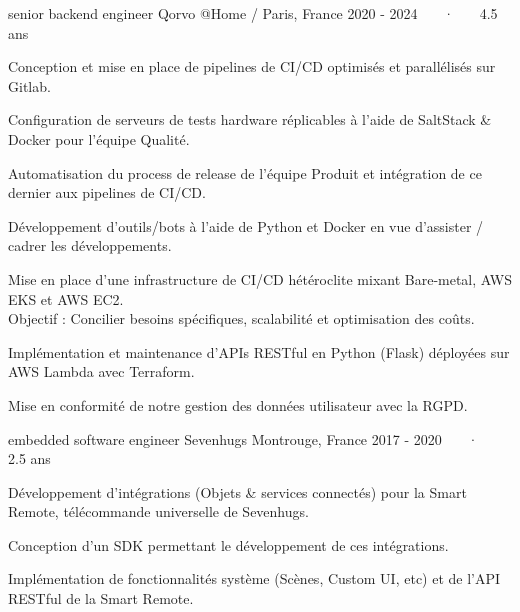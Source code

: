 

\begin{cventries}

  \cventry
    {senior backend engineer} %
    {Qorvo} %
    {@Home / Paris, France} %
    {2020 - 2024 ~~~·~~~ 4.5 ans} %
    {
      \begin{cvitems} %
        \item{Conception et mise en place de pipelines de CI/CD optimisés et parallélisés sur Gitlab.}
        \item{Configuration de serveurs de tests hardware réplicables à l'aide de SaltStack \& Docker pour l'équipe Qualité.}
        \item{Automatisation du process de release de l'équipe Produit et intégration de ce dernier aux pipelines de CI/CD.}
        \item{Développement d'outils/bots à l'aide de Python et Docker en vue d'assister / cadrer les développements.}
        \item{Mise en place d'une infrastructure de CI/CD hétéroclite mixant Bare-metal, AWS EKS et AWS EC2.\\ Objectif : Concilier besoins spécifiques, scalabilité et optimisation des coûts.}
        \item{Implémentation et maintenance d'APIs RESTful en Python (Flask) déployées sur AWS Lambda avec Terraform.}
        \item{Mise en conformité de notre gestion des données utilisateur avec la RGPD.}
      \end{cvitems}
    }

  \cventry
    {embedded software engineer} %
    {Sevenhugs} %
    {Montrouge, France} %
    {2017 -  2020 ~~~·~~~ 2.5 ans} %
    {
      \begin{cvitems} %
        \item {Développement d'intégrations (Objets \& services connectés) pour la Smart Remote, télécommande universelle de Sevenhugs.}
        \item {Conception d'un SDK permettant le développement de ces intégrations.}
        \item {Implémentation de fonctionnalités système (Scènes, Custom UI, etc) et de l'API RESTful de la Smart Remote.}
      \end{cvitems}
    }


\end{cventries}
